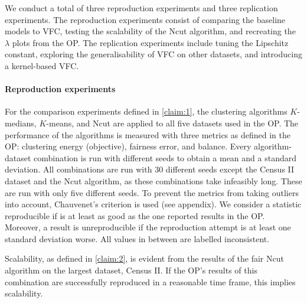 
We conduct a total of three reproduction experiments and three replication experiments. The reproduction experiments consist of comparing the baseline models to VFC, testing the scalability of the Ncut algorithm, and recreating the $\lambda$ plots from the OP. The replication experiments include tuning the Lipschitz constant, exploring the generalisability of VFC on other datasets, and introducing a kernel-based VFC. 





\paragraph{Reproduction experiments}
For the comparison experiments defined in \ref{claim:1}, the clustering algorithms $K$-medians, $K$-means, and Ncut are applied to all five datasets used in the OP.
The performance of the algorithms is measured with three metrics as defined in the OP: clustering energy (objective), fairness error, and balance. Every algorithm-dataset combination is run with different seeds to obtain a mean and a standard deviation. All combinations are run with 30 different seeds except the Census II dataset and the Ncut algorithm, as these combinations take infeasibly long. These are run with only five different seeds. To prevent the metrics from taking outliers into account, Chauvenet's criterion \cite{lin2007cleaning} is used (see appendix).
We consider a statistic reproducible if is at least as good as the one reported results in the OP. Moreover, a result is unreproducible if the reproduction attempt is at least one standard deviation worse. All values in between are labelled inconsistent.

Scalability, as defined in \ref{claim:2}, is evident from the results of the fair Ncut algorithm on the largest dataset, Census II. If the OP's results of this combination are successfully reproduced in a reasonable time frame, this implies scalability.

